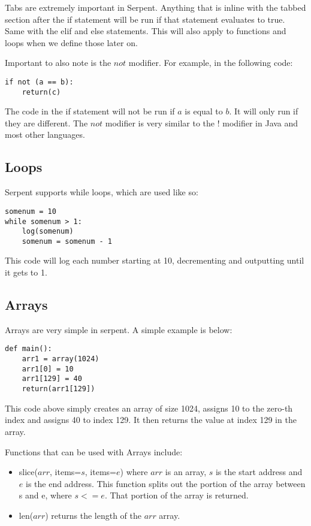 \documentclass[12pt]{article}
\begin{document}
	Tabs are extremely important in Serpent. Anything that is inline with the tabbed section after the if statement will be run if that statement evaluates to true. Same with the elif and else statements. This will also apply to functions and loops when we define those later on. \cite{Serpent}
	
	Important to also note is the $not$ modifier. For example, in the following code:
	
\begin{lstlisting}
if not (a == b):
	return(c)
\end{lstlisting}

The code in the if statement will not be run if $a$ is equal to $b$. It will only run if they are different. The $not$ modifier is very similar to the $!$ modifier in Java and most other languages. \cite{Serpent}
	
\subsection{Loops}
Serpent supports while loops, which are used like so:
\begin{lstlisting}
somenum = 10
while somenum > 1:
	log(somenum)
	somenum = somenum - 1
\end{lstlisting}

This code will log each number starting at 10, decrementing and outputting until it gets to 1. \cite{Serpent 1.0 (old)}

\subsection{Arrays}
Arrays are very simple in serpent. A simple example is below:
\begin{lstlisting}
def main():
	arr1 = array(1024)
	arr1[0] = 10
	arr1[129] = 40
	return(arr1[129])
\end{lstlisting}

This code above simply creates an array of size 1024, assigns 10 to the zero-th index and assigns 40 to index 129. It then returns the value at index 129 in the array. \cite{Serpent,Serpent 1.0 (old)}

Functions that can be used with Arrays include:
\begin{itemize}
	\item slice($arr$, items=$s$, items=$e$) where $arr$ is an array, $s$ is the start address and $e$ is the end address. This function splits out the portion of the array between s and e, where $s <= e$. That portion of the array is returned.
	\item len($arr$) returns the length of the $arr$ array.
\end{itemize}
\end{document}
